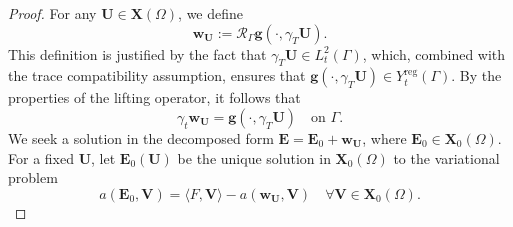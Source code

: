 \documentclass[12pt,reqno]{amsart}
\theoremstyle{definition}
\numberwithin{equation}{section}
\begin{document}
\begin{proof}
For any $\mathbf{U} \in \mathbf{X}(\Omega)$, we define
\[
\mathbf{w}_{\mathbf{U}} := \mathcal{R}_\Gamma \mathbf{g}(\cdot, \gamma_T \mathbf{U}).
\]
This definition is justified by the fact that $\gamma_T \mathbf{U} \in L_t^2(\Gamma)$, which, combined with the trace compatibility assumption, ensures that $\mathbf{g}(\cdot, \gamma_T \mathbf{U}) \in Y_t^{\mathrm{reg}}(\Gamma)$. By the properties of the lifting operator, it follows that
\[
\gamma_t \mathbf{w}_{\mathbf{U}} = \mathbf{g}(\cdot, \gamma_T \mathbf{U}) \quad \text{on } \Gamma.
\]
We seek a solution in the decomposed form $\mathbf{E} = \mathbf{E}_0 + \mathbf{w}_{\mathbf{U}}$, where $\mathbf{E}_0 \in \mathbf{X}_0(\Omega)$. For a fixed $\mathbf{U}$, let $\mathbf{E}_0(\mathbf{U})$ be the unique solution in $\mathbf{X}_0(\Omega)$ to the variational problem
\begin{equation}\label{eq:NPEC_E0_weak}
a(\mathbf{E}_0, \mathbf{V}) = \langle F, \mathbf{V} \rangle - a(\mathbf{w}_{\mathbf{U}}, \mathbf{V}) \quad \forall \mathbf{V} \in \mathbf{X}_0(\Omega).
\end{equation}


\end{proof}
\end{document}

